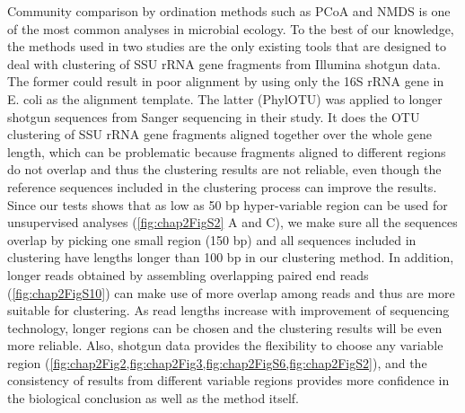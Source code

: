 \documentclass[]{msu-thesis}
\begin{document}
Community comparison by ordination methods such as PCoA and NMDS is one of the most common analyses in microbial ecology. To the best of our knowledge, the methods used in two studies \cite{luo_soil_2014,sharpton_phylotu:_2011} are the only existing tools that are designed to deal with clustering of SSU rRNA gene fragments from Illumina shotgun data. The former could result in poor alignment by using only the 16S rRNA gene in E. coli as the alignment template. The latter (PhylOTU) was applied to longer shotgun sequences from Sanger sequencing in their study. It does the OTU clustering of SSU rRNA gene fragments aligned together over the whole gene length, which can be problematic because fragments aligned to different regions do not overlap and thus the clustering results are not reliable, even though the reference sequences included in the clustering process can improve the results. Since our tests shows that as low as 50 bp hyper-variable region can be used for unsupervised analyses (\cref{fig:chap2FigS2} A and C), we make sure all the sequences overlap by picking one small region (150 bp) and all sequences included in clustering have lengths longer than 100 bp in our clustering method. In addition, longer reads obtained by assembling overlapping paired end reads (\cref{fig:chap2FigS10}) can make use of more overlap among reads and thus are more suitable for clustering. As read lengths increase with improvement of sequencing technology, longer regions can be chosen and the clustering results will be even more reliable. Also, shotgun data provides the flexibility to choose any variable region (\cref{fig:chap2Fig2,fig:chap2Fig3,fig:chap2FigS6,fig:chap2FigS2}), and the consistency of results from different variable regions provides more confidence in the biological conclusion as well as the method itself.
\end{document}
